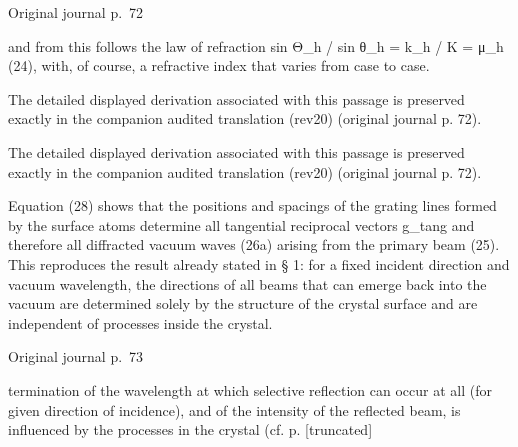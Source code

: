\documentclass[10pt]{article}
\newcommand{\origpage}[1]{\par\medskip\noindent\hfill{\small\color{notegray}Original journal p.~#1}\hfill\mbox{}\par\smallskip}
\begin{document}
\origpage{72}
and from this follows the law of refraction sin Θ\_h / sin θ\_h = k\_h / K = μ\_h (24), with, of course, a refractive index that varies from case to case.\par
The detailed displayed derivation associated with this passage is preserved exactly in the companion audited translation (rev20) (original journal p. 72).\par
The detailed displayed derivation associated with this passage is preserved exactly in the companion audited translation (rev20) (original journal p. 72).\par
Equation (28) shows that the positions and spacings of the grating lines formed by the surface atoms determine all tangential reciprocal vectors g\_tang and therefore all diffracted vacuum waves (26a) arising from the primary beam (25). This reproduces the result already stated in § 1: for a fixed incident direction and vacuum wavelength, the directions of all beams that can emerge back into the vacuum are determined solely by the structure of the crystal surface and are independent of processes inside the crystal.\par
\origpage{73}
termination of the wavelength at which selective reflection can occur at all (for given direction of incidence), and of the intensity of the reflected beam, is influenced by the processes in the crystal (cf. p. [truncated]\par
\end{document}

